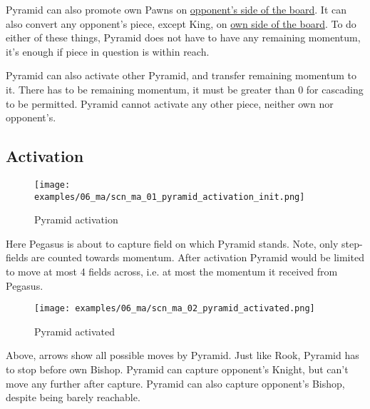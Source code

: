 Pyramid can also promote own Pawns on
\hyperref[sec:Definitions/Chessboard sides, navigation]{opponent's side of the board}.
It can also convert any opponent's piece, except King, on
\hyperref[sec:Definitions/Chessboard sides, navigation]{own side of the board}.
To do either of these things, Pyramid does not have to have any remaining
momentum, it's enough if piece in question is within reach.

Pyramid can also activate other Pyramid, and transfer remaining momentum to it.
There has to be remaining momentum, it must be greater than 0 for cascading
to be permitted. Pyramid cannot activate any other piece, neither own nor
opponent's.

\clearpage %

\subsection*{Activation}
\label{sec:Mayan Ascendancy/Pyramid/Activation}

\noindent
\begin{figure}[!h]
\texttt{[image: examples/06\_ma/scn\_ma\_01\_pyramid\_activation\_init.png]}
\caption{Pyramid activation}
\label{fig:scn_ma_01_pyramid_activation_init}
\end{figure}

Here Pegasus is about to capture field on which Pyramid stands. Note, only
step-fields are counted towards momentum. After activation Pyramid would be
limited to move at most 4 fields across, i.e. at most the momentum it received
from Pegasus.

\clearpage %

\noindent
\begin{figure}[!h]
\texttt{[image: examples/06\_ma/scn\_ma\_02\_pyramid\_activated.png]}
\caption{Pyramid activated}
\label{fig:scn_ma_02_pyramid_activated}
\end{figure}

Above, arrows show all possible moves by Pyramid. Just like Rook, Pyramid has to
stop before own Bishop. Pyramid can capture opponent's Knight, but can't move any
further after capture. Pyramid can also capture opponent's Bishop, despite being
barely reachable.

